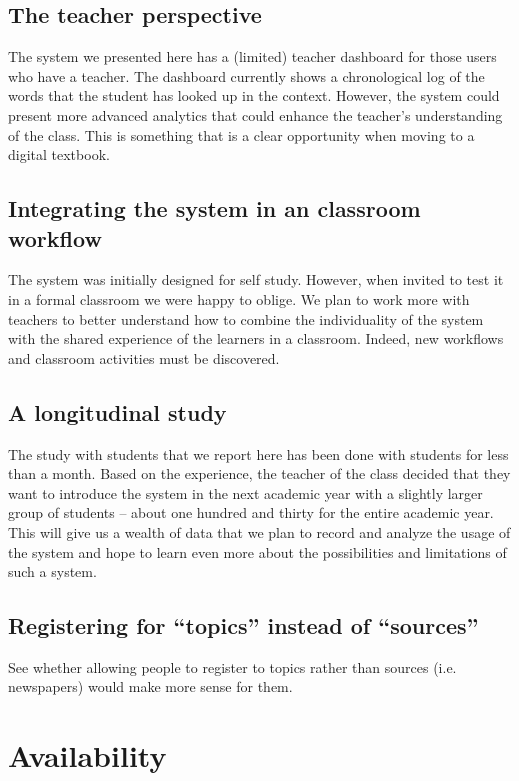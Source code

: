 \subsection{The teacher perspective}
The system we presented here has a (limited) teacher dashboard for those users who have a teacher. The dashboard currently shows a chronological log of the words that the student has looked up in the context. However, the system could present more advanced analytics that could enhance the teacher's understanding of the class. This is something that is a clear opportunity when moving to a digital textbook. 

\subsection{Integrating the system in an classroom workflow}
The system was initially designed for self study. However, when invited to test it in a formal classroom we were happy to oblige. We plan to work more with teachers to better understand how to combine the individuality of the system with the shared experience of the learners in a classroom. Indeed, new workflows and classroom activities must be discovered.

\subsection{A longitudinal study}
The study with students that we report here has been done with \stcnt students for less than a month. Based on the experience, the teacher of the class decided that they want to introduce the system in the next academic year with a slightly larger group of students -- about one hundred and thirty for the entire academic year. This will give us a wealth of data that we plan to record and analyze the usage of the system and hope to learn even more about the possibilities and limitations of such a system. 

\subsection{Registering for ``topics'' instead of ``sources''}
See whether allowing people to register to topics rather than sources (i.e. newspapers) would make more sense for them. 




\section{Availability}

